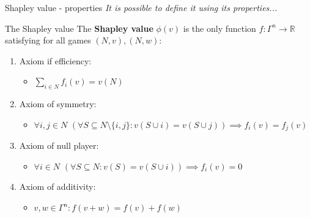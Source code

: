 \documentclass{beamer}
\begin{document}
\begin{frame}{Shapley value - properties}
    \textit{It is possible to define it using its properties...}
    \begin{block}{The Shapley value}
       The \textbf{Shapley value} $\phi(v)$ is the only function $f \colon \Gamma^n \to \mathbb{R}$ satisfying for all games $(N,v),(N,w)$:
        \begin{enumerate}
            \item Axiom if efficiency:
            \begin{itemize}
                \item $\sum_{i \in N}f_i(v) = v(N)$
            \end{itemize}
            \item Axiom of symmetry:
            \begin{itemize}
                \item$\forall i,j \in N$ $(\forall S \subseteq N \setminus \{i,j\}: v(S \cup i) = v(S \cup j)) \implies f_i(v) = f_j(v)$
            \end{itemize}
            \item Axiom of null player:
            \begin{itemize}
                \item $\forall i \in N$ $(\forall S \subseteq N: v(S) = v(S \cup i)) \implies f_i(v)=0$
            \end{itemize}
            \item Axiom of additivity:
            \begin{itemize}
                \item $v,w \in \Gamma^n: f(v+w)=f(v)+f(w)$
            \end{itemize}
        \end{enumerate}

    \end{block}
\end{frame}


\end{document}
